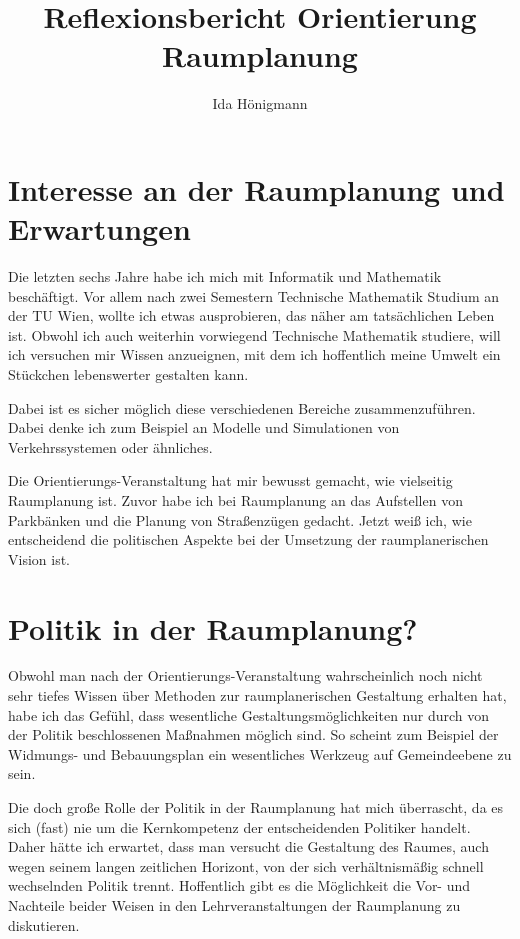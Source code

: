 \documentclass[]{article}
\title{Reflexionsbericht Orientierung Raumplanung}
\author{Ida Hönigmann}
\begin{document}
\maketitle

\begin{abstract}

\end{abstract}

\section{Interesse an der Raumplanung und Erwartungen}
Die letzten sechs Jahre habe ich mich mit Informatik und Mathematik beschäftigt. Vor allem nach zwei Semestern Technische Mathematik Studium an der TU Wien, wollte ich etwas ausprobieren, das näher am tatsächlichen Leben ist. Obwohl ich auch weiterhin vorwiegend Technische Mathematik studiere, will ich versuchen mir Wissen anzueignen, mit dem ich hoffentlich meine Umwelt ein Stückchen lebenswerter gestalten kann.

Dabei ist es sicher möglich diese verschiedenen Bereiche zusammenzuführen. Dabei denke ich zum Beispiel an Modelle und Simulationen von Verkehrssystemen oder ähnliches.

Die Orientierungs-Veranstaltung hat mir bewusst gemacht, wie vielseitig Raumplanung ist. Zuvor habe ich bei Raumplanung an das Aufstellen von Parkbänken und die Planung von Straßenzügen gedacht. Jetzt weiß ich, wie entscheidend die politischen Aspekte bei der Umsetzung der raumplanerischen Vision ist.

\section{Politik in der Raumplanung?}
Obwohl man nach der Orientierungs-Veranstaltung wahrscheinlich noch nicht sehr tiefes Wissen über Methoden zur raumplanerischen Gestaltung erhalten hat, habe ich das Gefühl, dass wesentliche Gestaltungsmöglichkeiten nur durch von der Politik beschlossenen Maßnahmen möglich sind. So scheint zum Beispiel der Widmungs- und Bebauungsplan ein wesentliches Werkzeug auf Gemeindeebene zu sein.

Die doch große Rolle der Politik in der Raumplanung hat mich überrascht, da es sich (fast) nie um die Kernkompetenz der entscheidenden Politiker handelt. Daher hätte ich erwartet, dass man versucht die Gestaltung des Raumes, auch wegen seinem langen zeitlichen Horizont, von der sich verhältnismäßig schnell wechselnden Politik trennt. Hoffentlich gibt es die Möglichkeit die Vor- und Nachteile beider Weisen in den Lehrveranstaltungen der Raumplanung zu diskutieren.
\end{document}
